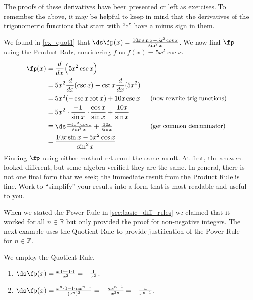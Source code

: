 The proofs of these derivatives have been presented or left as exercises. To remember the above, it may be helpful to keep in mind that the derivatives of the trigonometric functions that start with ``c'' have a minus sign in them.

{We found in \autoref{ex_quot1} that $\ds \fp(x) = \frac{10x\sin x - 5x^2\cos x}{\sin^2 x}$. We now find $\fp$ using the Product Rule, considering $f$ as $f(x) = 5x^2\csc x$.
\begin{align*}
	\fp(x)
	&= \frac{d}{dx}\Big(5x^2\csc x\Big) \\
	& = 5x^2 \frac{d}{dx} (\csc x) - \csc x \frac{d}{dx}(5x^2) \\
	&= \parbox{140pt}{$5x^2(-\csc x\cot x) + 10x\csc x$} \text{\small (now rewrite trig functions)}\\
	&= 5x^2\cdot \frac{-1}{\sin x}\cdot \frac{\cos x}{\sin x} + \frac{10x}{\sin x}\\
	&= \parbox{140pt}{$\ds\frac{-5x^2\cos x}{\sin ^2x}+\frac{10x}{\sin x}$} \text{\small (get common denominator)}\\
	&= \frac{10x\sin x - 5x^2\cos x}{\sin^2x}
\end{align*}
Finding $\fp$ using either method returned the same result. At first, the answers looked different, but some algebra verified they are the same. In general, there is not one final form that we seek; the immediate result from the Product Rule is fine. Work to ``simplify\primeskip'' your results into a form that is most readable and useful to you.}

When we stated the Power Rule in \autoref{sec:basic_diff_rules} we claimed that it worked for all $n\in\mathbb{R}$ but only provided the proof for non-negative integers. The next example uses the Quotient Rule to provide justification of the Power Rule for  $n\in\mathbb{Z}$.

{We employ the Quotient Rule.
\begin{enumerate}
	\item	$\ds \fp(x) = \frac{x\cdot 0 - 1\cdot 1}{x^2} = -\frac{1}{x^2}$.
	\item	$\ds \fp(x) = \frac{x^n\cdot 0 - 1\cdot nx^{n-1}}{(x^n)^2} = -\frac{nx^{n-1}}{x^{2n}} = -\frac{n}{x^{n+1}}.$\eoehere
\end{enumerate}}

